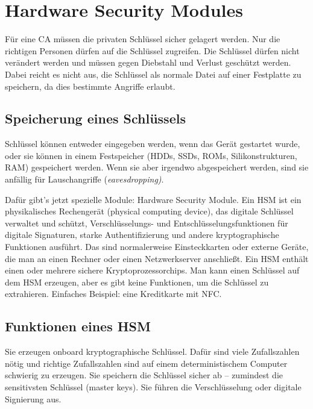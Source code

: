 \section{Hardware Security Modules}%
\label{sec:hardware_security_modules}

Für eine CA müssen die privaten Schlüssel sicher gelagert werden.
Nur die richtigen Personen dürfen auf die Schlüssel zugreifen.
Die Schlüssel dürfen nicht verändert werden und müssen gegen Diebstahl und Verlust
geschützt werden.
Dabei reicht es nicht aus, die Schlüssel als normale Datei auf einer Festplatte zu
speichern, da dies bestimmte Angriffe erlaubt.

\subsection{Speicherung eines Schlüssels}%
\label{sub:speicherung_eines_schlussels}

Schlüssel können entweder eingegeben werden, wenn das Gerät gestartet wurde, oder sie
können in einem Festspeicher (HDDs, SSDs, ROMs, Silikonstrukturen, RAM) gespeichert
werden.
Wenn sie aber irgendwo abgespeichert werden, sind sie anfällig für Lauschangriffe
(\emph{eavesdropping)}.

Dafür gibt’s jetzt spezielle Module: Hardware Security Module.
Ein HSM ist ein physikalisches Rechengerät (physical computing device),
das digitale Schlüssel verwaltet und schützt,
Verschlüsselungs- und Entschlüsselungsfunktionen für digitale Signaturen,
starke Authentifizierung und andere kryptographische Funktionen ausführt.
Das sind normalerweise Einsteckkarten oder externe Geräte, die man an einen Rechner oder
einen Netzwerkserver anschließt.
Ein HSM enthält einen oder mehrere sichere Kryptoprozessorchips.
Man kann einen Schlüssel auf dem HSM erzeugen, aber es gibt keine Funktionen, um die
Schlüssel zu extrahieren.
Einfaches Beispiel: eine Kreditkarte mit NFC.

\subsection{Funktionen eines HSM}%
\label{sub:funktionen_eines_hsm}

Sie erzeugen onboard kryptographische Schlüssel.
Dafür sind viele Zufallszahlen nötig und richtige Zufallszahlen sind auf einem
deterministischem Computer schwierig zu erzeugen.
Sie speichern die Schlüssel sicher ab – zumindest die sensitivsten Schlüssel (master
keys).
Sie führen die Verschlüsselung oder digitale Signierung aus.


